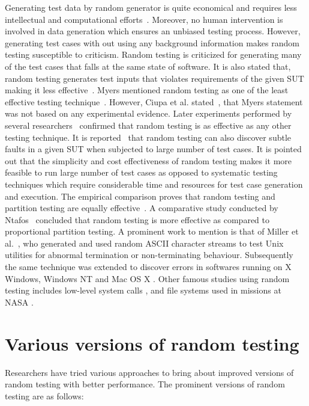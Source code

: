 Generating test data by random generator is quite economical and requires less intellectual and computational efforts~\cite{Ciupa2008a}. Moreover, no human intervention is involved in data generation which ensures an unbiased testing process. However, generating test cases with out using any background information makes random testing susceptible to criticism. Random testing is criticized for generating many of the test cases that falls at the same state of software. It is also stated that, random testing generates test inputs that violates requirements of the given SUT making it less effective~\cite{pacheco2009directed, sen2007effective}. Myers mentioned random testing as one of the least effective testing technique~\cite{Myers1979}. However, Ciupa et al. stated~\cite{Ciupa2007}, that Myers statement was not based on any experimental evidence. Later experiments performed by several researchers~\cite{Ciupa2008, hamlet1994,  leitner2007efficient, Duran1981} confirmed that random testing is as effective as any other testing technique. It is reported~\cite{Duran1981} that random testing can also discover subtle faults in a given SUT when subjected to large number of test cases. It is pointed out that the simplicity and cost effectiveness of random testing makes it more feasible to run large number of test cases as opposed to systematic testing techniques which require considerable time and resources for test case generation and execution. The empirical comparison proves that random testing and partition testing are equally effective~\cite{hamlet1990}. A comparative study conducted by Ntafos~\cite{ntafos1998random} concluded that random testing is more effective as compared to proportional partition testing. A prominent work to mention is that of Miller et al.~\cite{miller1990empirical}, who generated and used random ASCII character streams to test Unix utilities for abnormal termination or non-terminating behaviour. Subsequently the same technique was extended to discover errors in softwares running on X Windows, Windows NT and Mac OS X \cite{forrester2000empirical, miller2006empirical}. Other famous studies using random testing includes low-level system calls \cite{kropp1998automated}, and file systems used in missions at NASA \cite{groce2007randomized}.


\section{Various versions of random testing}
Researchers have tried various approaches to bring about improved versions of random testing with better performance. The prominent versions of random testing are as follows:

